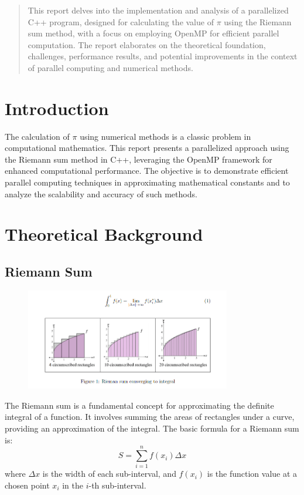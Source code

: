 \documentclass[11pt]{article}
\begin{document}
    
    \maketitle
    \thispagestyle{empty}
    \newpage

    \begin{abstract}
    This report delves into the implementation and analysis of a parallelized C++ program, designed for calculating the value of $\pi$ using the Riemann sum method, with a focus on employing OpenMP for efficient parallel computation. The report elaborates on the theoretical foundation, challenges, performance results, and potential improvements in the context of parallel computing and numerical methods.
    \end{abstract}

    \tableofcontents
    
    \newpage
    
    \section{Introduction}
    The calculation of $\pi$ using numerical methods is a classic problem in computational mathematics. This report presents a parallelized approach using the Riemann sum method in C++, leveraging the OpenMP framework for enhanced computational performance. The objective is to demonstrate efficient parallel computing techniques in approximating mathematical constants and to analyze the scalability and accuracy of such methods.

    \section{Theoretical Background}
    \subsection{Riemann Sum}
    \begin{figure}[h]
        \centering
        \includegraphics[width=0.8\textwidth]{img/riemansum.png}
        \label{fig:riemann_sum}
    \end{figure}
    The Riemann sum is a fundamental concept for approximating the definite integral of a function. It involves summing the areas of rectangles under a curve, providing an approximation of the integral. The basic formula for a Riemann sum is:
    \[ S = \sum_{i=1}^{n} f(x_i) \Delta x \]
    where $\Delta x$ is the width of each sub-interval, and $f(x_i)$ is the function value at a chosen point $x_i$ in the $i$-th sub-interval.
\end{document}
